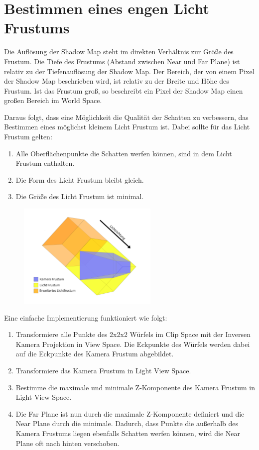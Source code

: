 \section{Bestimmen eines engen Licht Frustums}
\label{section:fit-the-frustum}
Die Auflösung der Shadow Map steht im direkten Verhältnis zur Größe des Frustum.
Die Tiefe des Frustums (Abstand zwischen Near und Far Plane) ist relativ zu der Tiefenauflösung der Shadow Map.
Der Bereich, der von einem Pixel der Shadow Map beschrieben wird, ist relativ zu der Breite und Höhe des Frustum.
Ist das Frustum groß, so beschreibt ein Pixel der Shadow Map einen großen Bereich im World Space.
\par
Daraus folgt, dass eine Möglichkeit die Qualität der Schatten zu verbessern, das Bestimmen eines möglichst kleinem
Licht Frustum ist. Dabei sollte für das Licht Frustum gelten:
\begin{enumerate}
  \item Alle Oberflächenpunkte die Schatten werfen können, sind in dem Licht Frustum enthalten.
  \item Die Form des Licht Frustum bleibt gleich.
  \item Die Größe des Licht Frustum ist minimal.
\end{enumerate}
\begin{figure}[H]
	\begin{center}
    \includegraphics[width=0.6\textwidth]{res/img/fit-the-frustum.jpg}
    \caption{}
	  \label{fig:fit-the-frustum}
	\end{center}
\end{figure}
Eine einfache Implementierung funktioniert wie folgt:
\begin{enumerate}
  \item Transformiere alle Punkte des 2x2x2 Würfels im Clip Space mit der Inversen Kamera Projektion
    in View Space. Die Eckpunkte des Würfels werden dabei auf die Eckpunkte des Kamera Frustum abgebildet.
  \item Transformiere das Kamera Frustum in Light View Space.
  \item Bestimme die maximale und minimale Z-Komponente des Kamera Frustum in Light View Space.
  \item Die Far Plane ist nun durch die maximale Z-Komponente definiert und die Near 
    Plane durch die minimale. Dadurch, dass Punkte die außerhalb des Kamera Frustums liegen ebenfalls Schatten werfen können,
    wird die Near Plane oft nach hinten verschoben.
\end{enumerate}
